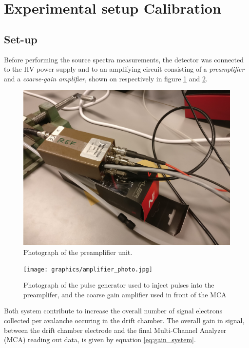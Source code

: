 \section{Experimental setup Calibration}

\subsection{Set-up}
Before performing the source spectra measurements, the detector was connected to the HV power supply and to an amplifying circuit consisting of a \textit{preamplifier} and a \textit{coarse-gain amplifier}, shown on respectively in figure \ref{fig:preamp_photo} and \ref{fig:ampli_gene}. 

\begin{figure}[ht]
  \includegraphics[width=\textwidth]{graphics/preamplifier.jpg}
  \caption{Photograph of the preamplifier unit.}
  \label{fig:preamp_photo}
\end{figure}

\begin{figure}[ht]
  \texttt{[image: graphics/amplifier\_photo.jpg]}
  \caption{Photograph of the pulse generator used to inject pulses into the preamplifer, and the coarse gain amplifier used in front of the MCA}
  \label{fig:ampli_gene}
\end{figure}

Both system contribute to increase the overall number of signal electrons collected per avalanche occuring in the drift chamber. The overall gain in signal, between the drift chamber electrode and the final Multi-Channel Analyzer (MCA) reading out data, is given by equation \ref{eq:gain_system}.

